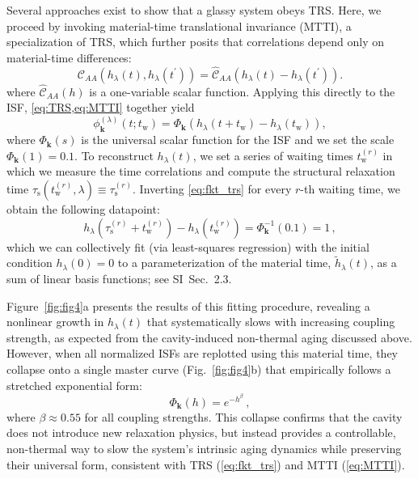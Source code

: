 \documentclass[aps, prl,
 reprint,
 superscriptaddress,
 citeautoscript,  %
 amsmath,amssymb,
 tightenlines
]{revtex4-2}
\begin{document}
Several approaches exist to show that a glassy system obeys TRS.\cite{ghimenti2024cleveralgorithmsglassesdo,Kurchan2023}
Here, we proceed by invoking material-time translational invariance (MTTI),\cite{bohmer2024time} a specialization of TRS, which further posits that correlations depend only on material-time differences:
\begin{equation}
\mathcal{C}_{AA}(h_\lambda(t),h_\lambda(t^\prime))=\mathcal{\widehat{C}}_{AA}\!\left(h_\lambda(t)-h_\lambda(t^\prime)\right). \label{eq:MTTI}
\end{equation}
where $\mathcal{\widehat{C}}_{AA}(h)$ is a one-variable scalar function. Applying this directly to the ISF, \cref{eq:TRS,eq:MTTI} together yield
\begin{equation}
\phi_{\bm k}^{(\lambda)}(t; t_\mathrm{w}) = \Phi_{\bm k}(h_\lambda(t+t_\mathrm{w})-h_\lambda(t_\mathrm{w})), \label{eq:fkt_trs}
\end{equation}
where $\Phi_{\bm k}(s)$ is the universal scalar function for the ISF and we set the scale $\Phi_{\bm k}(1) = 0.1$. 
To reconstruct $h_\lambda(t)$, we set a series of waiting times $t_\mathrm{w}^{(r)}$ in which we measure the time correlations and compute the structural relaxation time $\tau_\mathrm{s}(t_\mathrm{w}^{(r)},\lambda) \equiv \tau_\mathrm{s}^{(r)}$. 
Inverting \cref{eq:fkt_trs} for every $r$-th waiting time, we obtain the following datapoint:
\begin{equation}
h_\lambda(\tau_\mathrm{s}^{(r)}+t_\mathrm{w}^{(r)}) - h_\lambda(t_\mathrm{w}^{(r)}) =  \Phi_{\bm k}^{-1}(0.1) = 1 \,, \label{eq:const_mtti}
\end{equation}
which we can collectively fit (via least-squares regression) with the initial condition $h_\lambda(0) = 0$ to a parameterization of the material time, $\tilde{h}_\lambda(t)$, as a sum of linear basis functions; see SI~Sec.~2.3. %

Figure~\ref{fig:fig4}a presents the results of this fitting procedure, revealing a nonlinear growth in $h_\lambda(t)$ that systematically slows with increasing coupling strength, as expected from the cavity-induced non-thermal aging discussed above. However, when all normalized ISFs are replotted using this material time, they collapse onto a single master curve (Fig.~\ref{fig:fig4}b) that empirically follows a stretched exponential form: 
\begin{equation}
\Phi_{\bm k}(h) = e^{-h^\beta} \,, \label{eq:stretchexp}
\end{equation}
where $\beta \approx 0.55$ for all coupling strengths. This collapse confirms that the cavity does not introduce new relaxation physics, but instead provides a controllable, non-thermal way to slow the system’s intrinsic aging dynamics while preserving their universal form, consistent with TRS (\cref{eq:fkt_trs}) and MTTI (\cref{eq:MTTI}).
\end{document}
